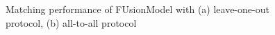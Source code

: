 \begin{figure}[h]
    \centering

    \caption{Matching performance of FUsionModel with (a) leave-one-out protocol, (b) all-to-all protocol}
    \label{fusionmodel-roc}
\end{figure}